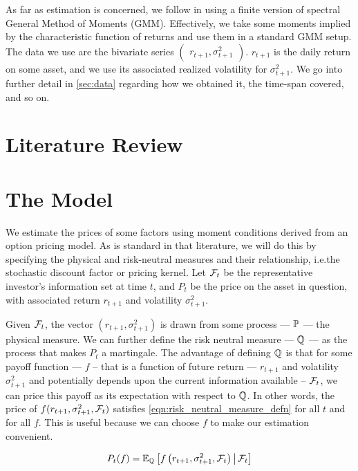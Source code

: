 \documentclass[11pt, letterpaper, twoside, final]{article}
\begin{document}
As far as estimation is concerned, we follow \textcite{khrapov2016affine} in using a finite version of spectral
General Method of Moments (GMM).
Effectively, we take some moments implied by the characteristic function of returns and use them in a standard GMM
setup.
The data we use are the bivariate series $\begin{pmatrix} r_{t+1}, \sigma^2_{t+1} \end{pmatrix}$.
$r_{t+1}$ is the daily return on some asset, and we use its associated realized volatility for $\sigma^2_{t+1}$.
We go into further detail in \cref{sec:data} regarding how we obtained it, the time-span covered, and so on.

\section{Literature Review}\label{sec:lit_review}


\section{The Model}\label{sec:model}

\addtocounter{subsection}{1}

We estimate the prices of some factors using moment conditions derived from an option pricing model. 
As is standard in that literature, we will do  this by specifying the physical and risk-neutral measures and their
relationship, i.e.\@ the stochastic discount factor or pricing kernel.
Let $\mathcal{F}_t$ be the representative investor's information set at time $t$, and $P_t$ be the price on the asset in
question, with associated return $r_{t+1}$ and volatility  $\sigma^2_{t+1}$.

Given $\mathcal{F}_{t}$, the vector $\left( r_{t+1},  \sigma^2_{t+1}\right)$ is drawn from some process --- $\mathbb{P}$ --- the
physical measure. 
We can further define the risk neutral measure --- $\mathbb{Q}$ ---  as the process that makes $P_t$ a martingale.
The advantage of defining $\mathbb{Q}$ is that for some payoff function --- $f$  -- that is a function of future return
--- $r_{t+1}$ and volatility $\sigma^2_{t+1}$ and potentially depends upon the current information available --
$\mathcal{F}_t$, we can price this payoff as its expectation with respect to $\mathbb{Q}$.
In other  words, the price of $f(r_{t+1}, \sigma^2_{t+1}, \mathcal{F}_t)$ satisfies \cref{eqn:risk_neutral_measure_defn}
for all $t$ and for all $f$.  
This is useful because we can choose $f$ to make our estimation convenient.

\begin{equation}
    P_t(f) = \operatorname{\mathbb{E}}_{\mathbb{Q}}\left[ f\left(r_{t+1}, \sigma^2_{t+1}, \mathcal{F}_{t}\right)  \,\middle\vert\, \mathcal{F}_{t}\right]
    \label{eqn:risk_neutral_measure_defn}
\end{equation}
\end{document}
